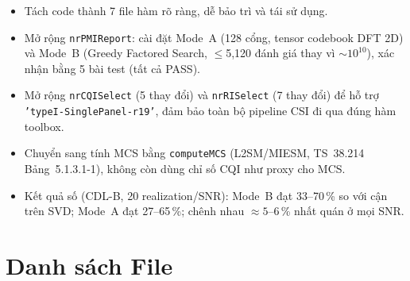 \documentclass[11pt,a4paper]{article}
\begin{document}
\begin{itemize}
    \item Tách code thành 7 file hàm rõ ràng, dễ bảo trì và tái sử dụng.
    \item Mở rộng \texttt{nrPMIReport}: cài đặt Mode~A (128 cổng, tensor codebook DFT 2D)
          và Mode~B (Greedy Factored Search, $\leq$5{,}120 đánh giá thay vì $\sim10^{10}$),
          xác nhận bằng 5 bài test (tất cả PASS).
    \item Mở rộng \texttt{nrCQISelect} (5 thay đổi) và \texttt{nrRISelect} (7 thay đổi)
          để hỗ trợ \texttt{'typeI-SinglePanel-r19'}, đảm bảo toàn bộ
          pipeline CSI đi qua đúng hàm toolbox.
    \item Chuyển sang tính MCS bằng \texttt{computeMCS} (L2SM/MIESM, TS~38.214
          Bảng~5.1.3.1-1), không còn dùng chỉ số CQI như proxy cho MCS.
    \item Kết quả số (CDL-B, 20 realization/SNR): Mode~B đạt 33--70\,\% so với
          cận trên SVD; Mode~A đạt 27--65\,\%; chênh nhau $\approx 5$--6\,\% nhất quán
          ở mọi SNR.
\end{itemize}

\appendix

\section{Danh sách File}
\end{document}
